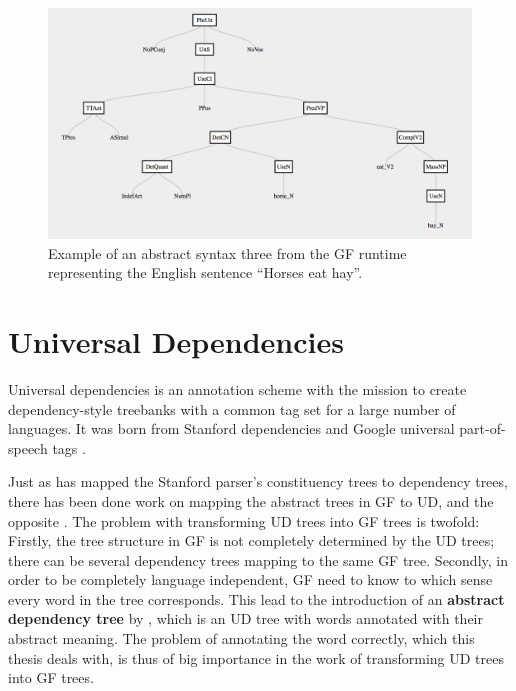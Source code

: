 \begin{figure}[!htbp]
\includegraphics[width=\linewidth]{figure/ast}
\caption{Example of an abstract syntax three from the GF runtime representing the English sentence ``Horses eat hay''.}
\label{fig:ast}
\end{figure}

\section{Universal Dependencies}
Universal dependencies is an annotation scheme with the mission to create dependency-style treebanks with a common tag set for a large number of languages. It was born from Stanford dependencies \citep{de2006generating} and Google universal part-of-speech tags \citep{petrov2011universal}.

Just as \citet{de2006generating} has mapped the Stanford parser's constituency trees to dependency trees, there has been done work on mapping the abstract trees in GF to UD, and the opposite \citep{kolachina2016gf2ud,kolachina2017ud2gf}. The problem with transforming UD trees into GF trees is twofold: Firstly, the tree structure in GF is not completely determined by the UD trees; there can be several dependency trees mapping to the same GF tree. Secondly, in order to be completely language independent, GF need to know to which sense every word in the tree corresponds. This lead to the introduction of an \textbf{abstract dependency tree} by \citet{kolachina2016gf2ud}, which is an UD tree with words annotated with their abstract meaning. The problem of annotating the word correctly, which this thesis deals with, is thus of big importance in the work of transforming UD trees into GF trees.

